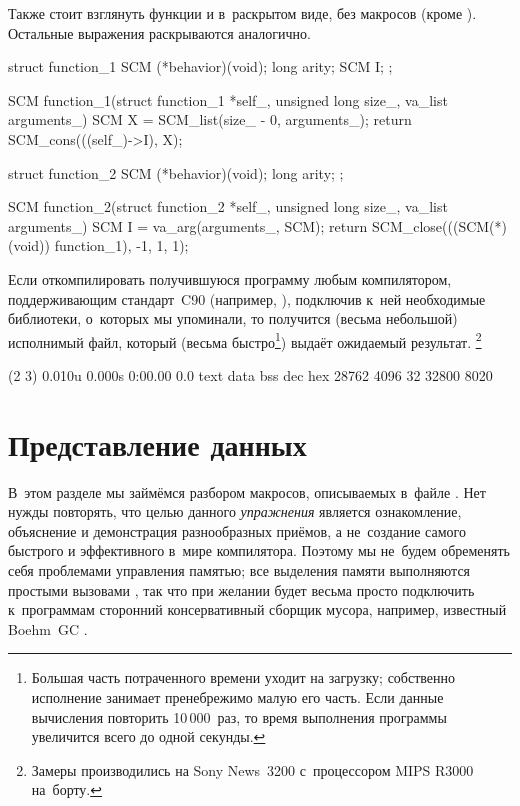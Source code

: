 Также стоит взглянуть функции  и  в~раскрытом
виде, без макросов (кроме ). Остальные выражения раскрываются
аналогично.

\begin{code:c}
struct function_1 {
    SCM     (*behavior)(void);
    long    arity;
    SCM     I;
};

SCM function_1(struct function_1 *self_,
               unsigned long size_,
               va_list arguments_)
{
    SCM X = SCM_list(size_ - 0, arguments_);
    return SCM_cons(((self_)->I), X);
}

struct function_2 {
    SCM     (*behavior)(void);
    long    arity;
};

SCM function_2(struct function_2 *self_,
               unsigned long size_,
               va_list arguments_)
{
    SCM I = va_arg(arguments_, SCM);
    return SCM_close(((SCM(*)(void)) function_1), -1, 1, 1);
}
\end{code:c}

Если откомпилировать получившуюся программу любым компилятором, поддерживающим
стандарт~C90 (например, ), подключив к~ней необходимые библиотеки,
о~которых мы упоминали, то получится (весьма небольшой) исполнимый файл,
который (весьма быстро\footnote{Большая часть потраченного времени уходит на
загрузку; собственно исполнение занимает пренебрежимо малую его часть. Если
данные вычисления повторить 10\,000~раз, то время выполнения программы
увеличится всего до одной секунды.}) выдаёт ожидаемый результат.%
\footnote*{Замеры производились на Sony News~3200 с~процессором MIPS R3000
на~борту.}

\begin{shell}
(2 3)
0.010u 0.000s 0:00.00 0.0%
text    data    bss     dec     hex
28762   4096    32      32800   8020
\end{shell}



\section{Представление данных}\label{cc/sect:data}

В~этом разделе мы займёмся разбором макросов, описываемых в~файле
. Нет нужды повторять, что целью данного \emph{упражнения}
является ознакомление, объяснение и демонстрация разнообразных приёмов, а
не~создание самого быстрого и эффективного в~мире компилятора. Поэтому мы
не~будем обременять себя проблемами управления памятью; все выделения памяти
выполняются простыми вызовами , так что при желании будет весьма
просто подключить к~программам сторонний консервативный сборщик мусора,
например, известный Boehm~GC \cite{bw88}.

